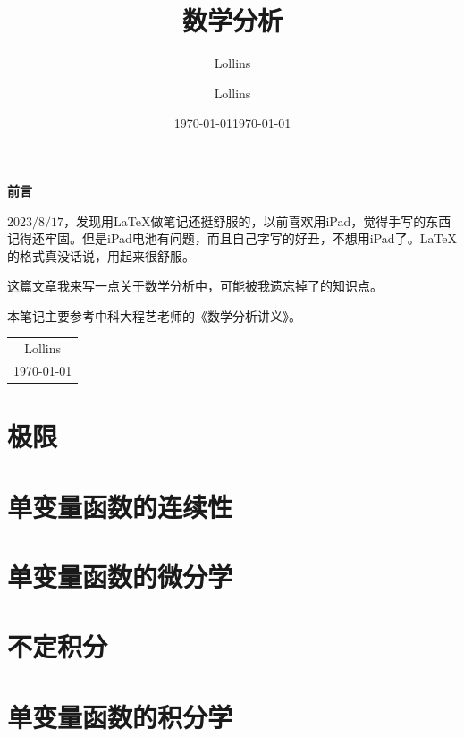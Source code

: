\documentclass[lang=cn,10pt]{elegantbook}
\author{Lollins}
\date{\today}
\begin{document}
\title{数学分析}
\author{Lollins}
\date{\today}

\maketitle

\setcounter{page}{1}

\begin{center}
    \Huge\textbf{前言}
\end{center}
\par
$2023/8/17$，发现用\LaTeX 做笔记还挺舒服的，以前喜欢用iPad，觉得手写的东西记得还牢固。但是iPad电池有问题，而且自己字写的好丑，不想用iPad了。\LaTeX 的格式真没话说，用起来很舒服。


这篇文章我来写一点关于数学分析中，可能被我遗忘掉了的知识点。

本笔记主要参考中科大程艺老师的《数学分析讲义》。


\begin{flushright}
    \begin{tabular}{c}
        Lollins \\
        \today
    \end{tabular}
\end{flushright}

\newpage
{}
\setcounter{page}{1}
\tableofcontents
\newpage
\setcounter{page}{1}

\chapter{极限}

\chapter{单变量函数的连续性}

\chapter{单变量函数的微分学}

\chapter{不定积分}

\chapter{单变量函数的积分学}
\end{document}
